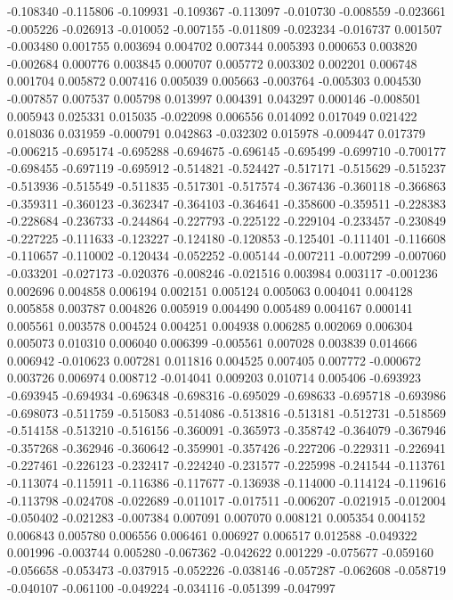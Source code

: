 -0.108340
-0.115806
-0.109931
-0.109367
-0.113097
-0.010730
-0.008559
-0.023661
-0.005226
-0.026913
-0.010052
-0.007155
-0.011809
-0.023234
-0.016737
0.001507
-0.003480
0.001755
0.003694
0.004702
0.007344
0.005393
0.000653
0.003820
-0.002684
0.000776
0.003845
0.000707
0.005772
0.003302
0.002201
0.006748
0.001704
0.005872
0.007416
0.005039
0.005663
-0.003764
-0.005303
0.004530
-0.007857
0.007537
0.005798
0.013997
0.004391
0.043297
0.000146
-0.008501
0.005943
0.025331
0.015035
-0.022098
0.006556
0.014092
0.017049
0.021422
0.018036
0.031959
-0.000791
0.042863
-0.032302
0.015978
-0.009447
0.017379
-0.006215
-0.695174
-0.695288
-0.694675
-0.696145
-0.695499
-0.699710
-0.700177
-0.698455
-0.697119
-0.695912
-0.514821
-0.524427
-0.517171
-0.515629
-0.515237
-0.513936
-0.515549
-0.511835
-0.517301
-0.517574
-0.367436
-0.360118
-0.366863
-0.359311
-0.360123
-0.362347
-0.364103
-0.364641
-0.358600
-0.359511
-0.228383
-0.228684
-0.236733
-0.244864
-0.227793
-0.225122
-0.229104
-0.233457
-0.230849
-0.227225
-0.111633
-0.123227
-0.124180
-0.120853
-0.125401
-0.111401
-0.116608
-0.110657
-0.110002
-0.120434
-0.052252
-0.005144
-0.007211
-0.007299
-0.007060
-0.033201
-0.027173
-0.020376
-0.008246
-0.021516
0.003984
0.003117
-0.001236
0.002696
0.004858
0.006194
0.002151
0.005124
0.005063
0.004041
0.004128
0.005858
0.003787
0.004826
0.005919
0.004490
0.005489
0.004167
0.000141
0.005561
0.003578
0.004524
0.004251
0.004938
0.006285
0.002069
0.006304
0.005073
0.010310
0.006040
0.006399
-0.005561
0.007028
0.003839
0.014666
0.006942
-0.010623
0.007281
0.011816
0.004525
0.007405
0.007772
-0.000672
0.003726
0.006974
0.008712
-0.014041
0.009203
0.010714
0.005406
-0.693923
-0.693945
-0.694934
-0.696348
-0.698316
-0.695029
-0.698633
-0.695718
-0.693986
-0.698073
-0.511759
-0.515083
-0.514086
-0.513816
-0.513181
-0.512731
-0.518569
-0.514158
-0.513210
-0.516156
-0.360091
-0.365973
-0.358742
-0.364079
-0.367946
-0.357268
-0.362946
-0.360642
-0.359901
-0.357426
-0.227206
-0.229311
-0.226941
-0.227461
-0.226123
-0.232417
-0.224240
-0.231577
-0.225998
-0.241544
-0.113761
-0.113074
-0.115911
-0.116386
-0.117677
-0.136938
-0.114000
-0.114124
-0.119616
-0.113798
-0.024708
-0.022689
-0.011017
-0.017511
-0.006207
-0.021915
-0.012004
-0.050402
-0.021283
-0.007384
0.007091
0.007070
0.008121
0.005354
0.004152
0.006843
0.005780
0.006556
0.006461
0.006927
0.006517
0.012588
-0.049322
0.001996
-0.003744
0.005280
-0.067362
-0.042622
0.001229
-0.075677
-0.059160
-0.056658
-0.053473
-0.037915
-0.052226
-0.038146
-0.057287
-0.062608
-0.058719
-0.040107
-0.061100
-0.049224
-0.034116
-0.051399
-0.047997
